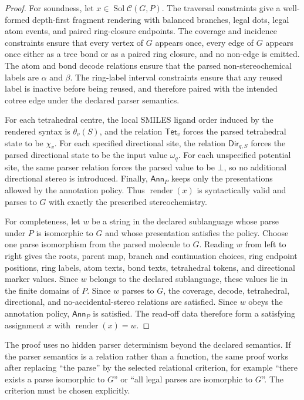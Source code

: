 \documentclass[10pt,a4paper]{article}
\newcommand{\calC}{\mathcal C}
\newcommand{\Sol}{\operatorname{Sol}}
\newcommand{\render}{\operatorname{render}}
\newcommand{\None}{\bot}
\newcommand{\Ann}{\mathsf{Ann}}
\newcommand{\Dir}{\mathsf{Dir}}
\newcommand{\Tet}{\mathsf{Tet}}
\theoremstyle{definition}
\theoremstyle{remark}
\begin{document}
	\begin{proof}
		For soundness, let \(x\in\Sol\calC(G,P)\).  The traversal constraints give a
		well-formed depth-first fragment rendering with balanced branches, legal dots,
		legal atom events, and paired ring-closure endpoints.  The coverage and
		incidence constraints ensure that every vertex of \(G\) appears once, every edge
		of \(G\) appears once either as a tree bond or as a paired ring closure, and no
		non-edge is emitted.  The atom and bond decode relations ensure that the parsed
		non-stereochemical labels are \(\alpha\) and \(\beta\).  The ring-label interval
		constraints ensure that any reused label is inactive before being reused, and
		therefore paired with the intended cotree edge under the declared parser
		semantics.

		For each tetrahedral centre, the local SMILES ligand order induced by the
		rendered syntax is \(\theta_v(S)\), and the relation \(\Tet_v\) forces the parsed
		tetrahedral state to be \(\chi_v\).  For each specified directional site, the
		relation \(\Dir_{q,S}\) forces the parsed directional state to be the input value
		\(\omega_q\).  For each unspecified potential site, the same parser relation
		forces the parsed value to be \(\None\), so no additional directional stereo is
		introduced.  Finally, \(\Ann_P\) keeps only the presentations allowed by the
		annotation policy.  Thus \(\render(x)\) is syntactically valid and parses to
		\(G\) with exactly the prescribed stereochemistry.

		For completeness, let \(w\) be a string in the declared sublanguage whose parse
		under \(P\) is isomorphic to \(G\) and whose presentation satisfies the policy.
		Choose one parse isomorphism from the parsed molecule to \(G\).  Reading \(w\)
		from left to right gives the roots, parent map, branch and continuation choices,
		ring endpoint positions, ring labels, atom texts, bond texts, tetrahedral tokens,
		and directional marker values.  Since \(w\) belongs to the declared sublanguage,
		these values lie in the finite domains of \(P\).  Since \(w\) parses to \(G\), the
		coverage, decode, tetrahedral, directional, and no-accidental-stereo relations
		are satisfied.  Since \(w\) obeys the annotation policy, \(\Ann_P\) is satisfied.
		The read-off data therefore form a satisfying assignment \(x\) with
		\(\render(x)=w\).
	\end{proof}

	The proof uses no hidden parser determinism beyond the declared semantics.  If
	the parser semantics is a relation rather than a function, the same proof works
	after replacing ``the parse'' by the selected relational criterion, for example
	``there exists a parse isomorphic to \(G\)'' or ``all legal parses are isomorphic
	to \(G\)''.  The criterion must be chosen explicitly.
\end{document}
